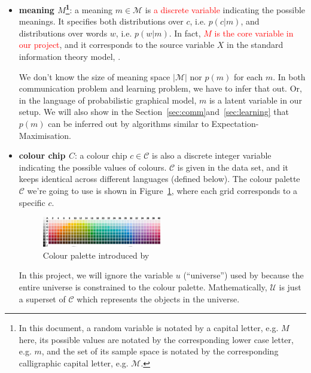 \documentclass[11pt]{article}
\begin{document}
\begin{itemize}[leftmargin=*]
    \item \textbf{meaning $M$\footnote{In this document, a random variable is notated by a capital letter, e.g. $M$ here, its possible values are notated by the corresponding lower case letter, e.g. $m$, and the set of its sample space is notated by the corresponding calligraphic capital letter, e.g. $\mathcal{M}$.}}: a meaning $m\in\mathcal{M}$ is \textcolor{red}{a discrete variable} indicating the possible meanings.
    It specifies both distributions over $c$, i.e. $p(c|m)$, and distributions over words $w$, i.e. $p(w|m)$.
    In fact, \textcolor{red}{$M$ is the core variable in our project}, and it corresponds to the source variable $X$ in the standard information theory model, \citep[e.g.][]{RDT}.
    
    We don't know the size of meaning space $|\mathcal{M}|$ nor $p(m)$ for each $m$.
    In both communication problem and learning problem, we have to infer that out.
    Or, in the language of probabilistic graphical model, $m$ is a latent variable in our setup.
    We will also show in the Section~\ref{sec:comm}and~\ref{sec:learning} that $p(m)$ can be inferred out by algorithms similar to Expectation-Maximisation. 

    \item \textbf{colour chip $C$}: a colour chip $c\in\mathcal{C}$ is also a discrete integer variable indicating the possible values of colours. 
    $\mathcal{C}$ is given in the data set, and it keeps identical across different languages (defined below). 
    The colour palette $\mathcal{C}$ we're going to use is shown in Figure~\ref{fig:colour_palette}, where each grid corresponds to a specific $c$.
        \begin{figure}[h]
            \centering
            \includegraphics[width=0.49\textwidth]{docs/intro_rate_distortion/graphs/colour_palette.jpg}
            \caption{Colour palette introduced by \citet{berlin1991basic}}
            \label{fig:colour_palette}
        \end{figure}
        
    In this project, we will ignore the variable $u$ (``universe'') used by \citet{zaslavsky2018efficient} because the entire universe is constrained to the colour palette. 
    Mathematically, $\mathcal{U}$ is just a superset of $\mathcal{C}$ which represents the objects in the universe.
    

\end{itemize}
\end{document}
